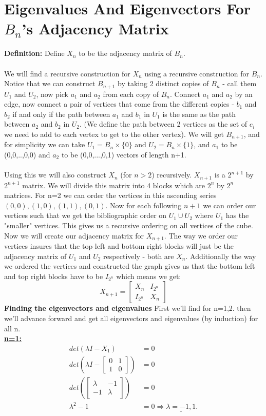 \documentclass{article}
\begin{document}
\section{Eigenvalues And Eigenvectors For $B_n$'s Adjacency Matrix}
\textbf{Definition:}
Define $X_n$ to be the adjacency matrix of $B_n$.
\\
\\
We will find a recursive construction for $X_n$ using a recursive construction for $B_n$. Notice that we can construct $B_{n+1}$ by taking 2 distinct copies of $B_n$ - call them $U_1$ and $U_2$, now pick $a_1$ and $a_2$ from each copy of $B_n$. Connect $a_1$ and $a_2$ by an edge, now connect a pair of vertices that come from the different copies - $b_1$ and $b_2$ if and only if the path between $a_1$ and $b_1$ in $U_1$ is the same as the path between $a_2$ and $b_2$ in $U_2$. (We define the path between 2 vertices as the set of $e_i$ we need to add to each vertex to get to the other vertex). We will get $B_{n+1}$, and for simplicity we can take $U_1 = B_n \times \{0\}$ and $U_2 = B_n \times \{1\}$, and $a_1$ to be (0,0,..,0,0) and $a_2$ to be (0,0,...,0,1) vectors of length n+1.
\\ \\ 
Using this we will also construct $X_n$ (for $n>2$) recursively. $X_{n+1}$ is a $2^{n+1}$ by $2^{n+1}$ matrix. We will divide this matrix into 4 blocks which are $2^n$ by $2^n$ matrices. For n=2 we can order the vertices in this ascending series $(0,0),(1,0),(1,1),(0,1)$. Now for each following $n+1$ we can order our vertices such that we get the bibliographic order on $U_1\cup U_2$ where $U_1$ has the "smaller" vertices. This gives us a recursive ordering on all vertices of the cube. Now we will create our adjacency matrix for $X_{n+1}$. The way we order our vertices insures that the top left and bottom right blocks will just be the adjacency matrix of $U_1$ and $U_2$ respectively - both are $X_n$. Additionally the way we ordered the vertices and constructed the graph gives us that the bottom left and top right blocks have to be $I_{2^n}$ which means we get:
\[X_{n+1} = \begin{bmatrix} X_n & I_{2^n} \\ I_{2^n} & X_n\end{bmatrix}\]
\textbf{Finding the eigenvectors and eigenvalues}
First we'll find for n=1,2. then we'll advance forward and get all eigenvectors and eigenvalues (by induction) for all n.\\
\underline{\textbf{n=1:} }
\begin{align*}det(\lambda I - X_1) &= 0 \\ det\left(\lambda I -\begin{bmatrix}
0 & 1 \\ 1 & 0
\end{bmatrix}\right) &= 0 \\ det\left(\begin{bmatrix}
\lambda & -1 \\ -1 & \lambda
\end{bmatrix}\right)&=0 \\ \lambda^2-1&=0 \Longrightarrow \underline{\lambda = -1,1}.\end{align*}
\end{document}
